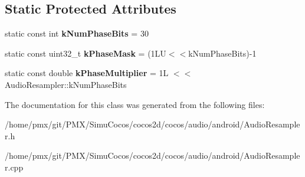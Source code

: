 \subsection*{Static Protected Attributes}
\begin{DoxyCompactItemize}
\item 
\mbox{\label{classcocos2d_1_1experimental_1_1AudioResampler_a534fda22f488f22fab6f80893ac58791}} 
static const int {\bfseries k\+Num\+Phase\+Bits} = 30
\item 
\mbox{\label{classcocos2d_1_1experimental_1_1AudioResampler_a67810a1cf235e1369731c662a8e06b19}} 
static const uint32\+\_\+t {\bfseries k\+Phase\+Mask} = (1\+L\+U$<$$<$k\+Num\+Phase\+Bits)-\/1
\item 
\mbox{\label{classcocos2d_1_1experimental_1_1AudioResampler_a93008273c991262344414fec67909b8a}} 
static const double {\bfseries k\+Phase\+Multiplier} = 1\+L $<$$<$ Audio\+Resampler\+::k\+Num\+Phase\+Bits
\end{DoxyCompactItemize}


The documentation for this class was generated from the following files\+:\begin{DoxyCompactItemize}
\item 
/home/pmx/git/\+P\+M\+X/\+Simu\+Cocos/cocos2d/cocos/audio/android/Audio\+Resampler.\+h\item 
/home/pmx/git/\+P\+M\+X/\+Simu\+Cocos/cocos2d/cocos/audio/android/Audio\+Resampler.\+cpp\end{DoxyCompactItemize}

